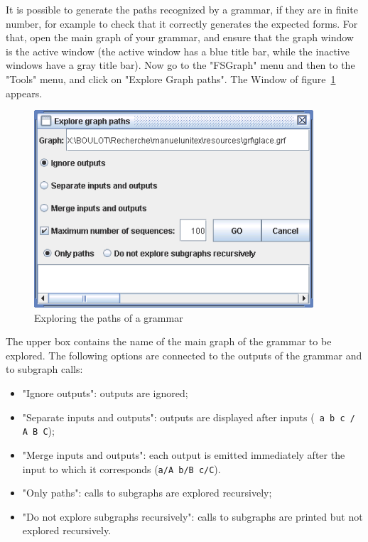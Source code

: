 It is possible to generate the paths recognized by a grammar, if they are in
finite number, for example to check that it correctly generates the expected
forms. For that, open the main graph of your grammar, and ensure that the graph
window is the active window (the active window has a blue title bar, while the
inactive windows have a gray title bar). Now go to the "FSGraph" menu and then to
the "Tools" menu, and click on "Explore Graph paths". The Window of
figure~\ref{fig-explore-graph-paths} appears.


\begin{figure}[!h]
\begin{center}
\includegraphics[width=10.4cm]{resources/img/fig6-18.png}
\caption{Exploring the paths of a grammar\label{fig-explore-graph-paths}}
\end{center}
\end{figure}

\bigskip
\noindent The upper box contains the name of the main graph of the grammar to be
explored. The following options are connected to the outputs of the grammar and
to subgraph calls:

\begin{itemize}
  \item "Ignore outputs": outputs are ignored;
  \item "Separate inputs and outputs": outputs are displayed after inputs
  (\verb$ a b c / A B C$);
  \item "Merge inputs and outputs": each output is emitted immediately after
  the input to which it corresponds  (\verb$a/A b/B c/C$).
  \item "Only paths": calls to subgraphs are explored recursively;
  \item "Do not explore subgraphs recursively": calls to subgraphs are printed
  but not explored recursively.
\end{itemize}

